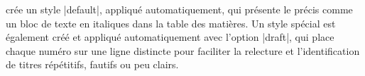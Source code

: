 \begin{noprint}
\newcommand{\cftbeforeprecis}{%
	\vskip.5\baselineskip\par%
	\noindent\hspace{\dimexpr\toclabelwidth+\tocnumwidth}%
	\begin{minipage*}{\dimexpr\textwidth-\toclabelwidth-\tocnumwidth-\@pnumwidth}}
\newcommand{\cftafterprecis}{%
	\end{minipage*}%
	\vskip.5\baselineskip\par}
\end{noprint}

\frenchlaw crée un style |default|, appliqué automatiquement, qui présente le précis comme un bloc de texte en italiques dans la table des matières. Un style spécial est également créé et appliqué automatiquement avec l'option |draft|, qui place chaque numéro sur une ligne distincte pour faciliter la relecture et l'identification de titres répétitifs, fautifs ou peu clairs. 

\begin{noprint}

\if@draft{}\fi
\end{noprint}

